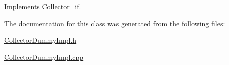 Implements \hyperlink{class_collector__if_a97fa632508ffdfad1365b3a949acf745}{Collector\+\_\+if}.



The documentation for this class was generated from the following files\+:\begin{DoxyCompactItemize}
\item 
\hyperlink{_collector_dummy_impl_8h}{Collector\+Dummy\+Impl.\+h}\item 
\hyperlink{_collector_dummy_impl_8cpp}{Collector\+Dummy\+Impl.\+cpp}\end{DoxyCompactItemize}
